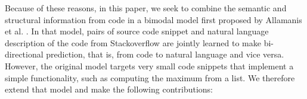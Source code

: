 Because of these reasons, in this paper, we seek to combine
the semantic and structural information from code in
a bimodal model first proposed by Allamanis et al.
.
In that model, pairs of source code snippet and natural language description of
the code from Stackoverflow are jointly learned to make bi-directional
prediction, that is, from code to natural language and vice versa.
However, the original model targets very small code snippets that implement
a simple functionality, such as computing the maximum from a list.
We therefore extend that model and make the following contributions:


